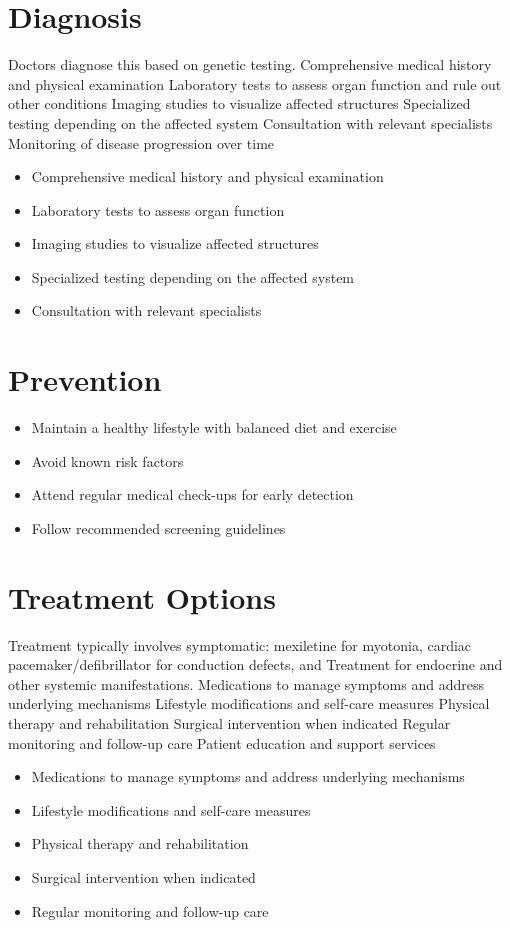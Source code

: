 \section{Diagnosis}
Doctors diagnose this based on genetic testing. Comprehensive medical history and physical examination Laboratory tests to assess organ function and rule out other conditions Imaging studies to visualize affected structures Specialized testing depending on the affected system Consultation with relevant specialists Monitoring of disease progression over time

\begin{itemize}[noitemsep]
  \item Comprehensive medical history and physical examination
  \item Laboratory tests to assess organ function
  \item Imaging studies to visualize affected structures
  \item Specialized testing depending on the affected system
  \item Consultation with relevant specialists
\end{itemize}
\section{Prevention}
\begin{itemize}[noitemsep]
  \item Maintain a healthy lifestyle with balanced diet and exercise
  \item Avoid known risk factors
  \item Attend regular medical check-ups for early detection
  \item Follow recommended screening guidelines
\end{itemize}
\section{Treatment Options}
Treatment typically involves symptomatic: mexiletine for myotonia, cardiac pacemaker/defibrillator for conduction defects, and Treatment for endocrine and other systemic manifestations. Medications to manage symptoms and address underlying mechanisms Lifestyle modifications and self-care measures Physical therapy and rehabilitation Surgical intervention when indicated Regular monitoring and follow-up care Patient education and support services

\begin{itemize}[noitemsep]
  \item Medications to manage symptoms and address underlying mechanisms
  \item Lifestyle modifications and self-care measures
  \item Physical therapy and rehabilitation
  \item Surgical intervention when indicated
  \item Regular monitoring and follow-up care
\end{itemize}
